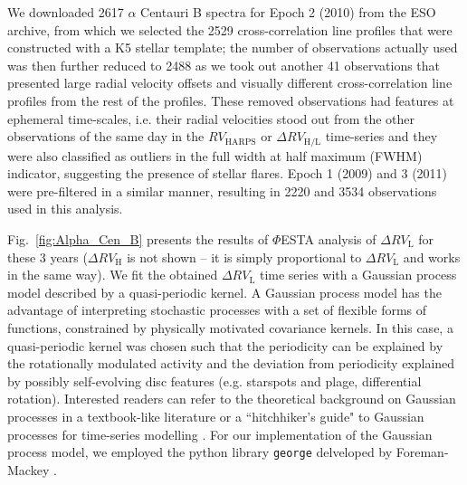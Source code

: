 We downloaded 2617 $\alpha$ Centauri B spectra for Epoch 2 (2010) from the ESO archive, from which we selected the 2529 cross-correlation line profiles that were constructed with a K5 stellar template; the number of observations actually used was then further reduced to 2488 as we took out another 41 observations that presented large radial velocity offsets and visually different cross-correlation line profiles from the rest of the profiles. These removed observations had features at ephemeral time-scales, i.e. their radial velocities stood out from the other observations of the same day in the $RV_\text{HARPS}$ or $\Delta RV_\text{H/L}$ time-series and they were also classified as outliers in the full width at half maximum (FWHM) indicator, suggesting the presence of stellar flares. Epoch 1 (2009) and 3 (2011) were pre-filtered in a similar manner, resulting in 2220 and 3534 observations used in this analysis.

Fig.~\ref{fig:Alpha_Cen_B} presents the results of $\mathit{\Phi}$ESTA analysis of $\Delta RV_\text{L}$ for these 3 years ($\Delta RV_\text{H}$ is not shown -- it is simply proportional to $\Delta RV_\text{L}$ and works in the same way). We fit the obtained $\Delta RV_\text{L}$ time series with a Gaussian process model described by a quasi-periodic kernel. A Gaussian process model has the advantage of interpreting stochastic processes with a set of flexible forms of functions, constrained by physically motivated covariance kernels. In this case, a quasi-periodic kernel was chosen such that the periodicity can be explained by the rotationally modulated activity and the deviation from periodicity explained by possibly self-evolving disc features (e.g. starspots and plage, differential rotation). Interested readers can refer to the theoretical background on Gaussian processes in a textbook-like literature \cite{Rasmussen2006} or a ``hitchhiker's guide" to Gaussian processes for time-series modelling \cite{Roberts_gaussianprocesses}. For our implementation of the Gaussian process model, we employed the python library \verb|george| delveloped by Foreman-Mackey \cite{Ambikasaran2014}. 

